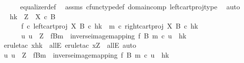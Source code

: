 \begin{isabellebody}
\ \ \ \ \isamarkupfalse%
\ equalizer{\isacharunderscore}{\kern0pt}def\ \isamarkupfalse%
\ assms{\isacharparenleft}{\kern0pt}{}{\isacharparenright}{\kern0pt}\ cfunc{\isacharunderscore}{\kern0pt}type{\isacharunderscore}{\kern0pt}def\ domain{\isacharunderscore}{\kern0pt}comp\ left{\isacharunderscore}{\kern0pt}cart{\isacharunderscore}{\kern0pt}proj{\isacharunderscore}{\kern0pt}type\ \isamarkupfalse%
\ auto\isanewline
\ \ \isamarkupfalse%
\ \isamarkupfalse%
\ {\isachardoublequoteopen}{\isasymlangle}h{\isacharcomma}{\kern0pt}k{\isasymrangle}\ {\isacharcolon}{\kern0pt}\ Z\ {\isasymrightarrow}\ X\ {\isasymtimes}\isactrlsub c\ B\ \ {\isasymLongrightarrow}\isanewline
\ \ \ \ \ \ {\isacharparenleft}{\kern0pt}f\ {\isasymcirc}\isactrlsub c\ left{\isacharunderscore}{\kern0pt}cart{\isacharunderscore}{\kern0pt}proj\ X\ B{\isacharparenright}{\kern0pt}\ {\isasymcirc}\isactrlsub c\ {\isasymlangle}h{\isacharcomma}{\kern0pt}k{\isasymrangle}\ {\isacharequal}{\kern0pt}\ {\isacharparenleft}{\kern0pt}m\ {\isasymcirc}\isactrlsub c\ right{\isacharunderscore}{\kern0pt}cart{\isacharunderscore}{\kern0pt}proj\ X\ B{\isacharparenright}{\kern0pt}\ {\isasymcirc}\isactrlsub c\ {\isasymlangle}h{\isacharcomma}{\kern0pt}k{\isasymrangle}\ {\isasymLongrightarrow}\isanewline
\ \ \ \ \ \ {\isacharparenleft}{\kern0pt}{\isasymexists}{\isacharbang}{\kern0pt}u{\isachardot}{\kern0pt}\ u\ {\isacharcolon}{\kern0pt}\ Z\ {\isasymrightarrow}\ {\isacharparenleft}{\kern0pt}f\isactrlsup {\isacharminus}{\kern0pt}B{\isasymrparr}\isactrlbsub m\isactrlesub {\isacharparenright}{\kern0pt}\ {\isasymand}\ inverse{\isacharunderscore}{\kern0pt}image{\isacharunderscore}{\kern0pt}mapping\ f\ B\ m\ {\isasymcirc}\isactrlsub c\ u\ {\isacharequal}{\kern0pt}\ {\isasymlangle}h{\isacharcomma}{\kern0pt}k{\isasymrangle}{\isacharparenright}{\kern0pt}{\isachardoublequoteclose}\isanewline
\ \ \ \ \isamarkupfalse%
\ {\isacharparenleft}{\kern0pt}erule{\isacharunderscore}{\kern0pt}tac\ x{\isacharequal}{\kern0pt}{\isachardoublequoteopen}{\isasymlangle}h{\isacharcomma}{\kern0pt}k{\isasymrangle}{\isachardoublequoteclose}\ \ allE{\isacharcomma}{\kern0pt}\ erule{\isacharunderscore}{\kern0pt}tac\ x{\isacharequal}{\kern0pt}Z\ \ allE{\isacharcomma}{\kern0pt}\ auto{\isacharparenright}{\kern0pt}\isanewline
\ \ \isamarkupfalse%
\ \isamarkupfalse%
\ {\isachardoublequoteopen}{\isasymexists}{\isacharbang}{\kern0pt}u{\isachardot}{\kern0pt}\ u\ {\isacharcolon}{\kern0pt}\ Z\ {\isasymrightarrow}\ {\isacharparenleft}{\kern0pt}f\isactrlsup {\isacharminus}{\kern0pt}B{\isasymrparr}\isactrlbsub m\isactrlesub {\isacharparenright}{\kern0pt}\ {\isasymand}\ inverse{\isacharunderscore}{\kern0pt}image{\isacharunderscore}{\kern0pt}mapping\ f\ B\ m\ {\isasymcirc}\isactrlsub c\ u\ {\isacharequal}{\kern0pt}\ {\isasymlangle}h{\isacharcomma}{\kern0pt}k{\isasymrangle}{\isachardoublequoteclose}\isanewline

\end{isabellebody}
